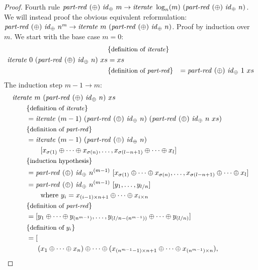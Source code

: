 \begin{proof}
  Fourth rule $\partRed\ (\oplus)\ \id_\oplus\ m \rightarrow \iterateN\ \log_n(m)\ (\partRed\ (\oplus)\ \id_\oplus\ n)$.
  We will instead proof the obvious equivalent reformulation:
  $\partRed\ (\oplus)\ \id_\oplus\ n^m \rightarrow \iterateN\ m\ (\partRed\ (\oplus)\ \id_\oplus\ n)$.
  Proof by induction over $m$.
  We start with the base case $m= 0$:
  \begin{align*}
      &\{\text{\small definition of \text{\textit{iterate}}}\}\\
    \text{\textit{iterate}}\ 0\ (\text{\textit{part-red}}\ (\oplus)\ \text{\textit{id}}_\oplus\ n)\ xs &= xs\\
      & \{\text{\small definition of \text{\textit{part-red}}}\}
      &= \text{\textit{part-red}}\ (\oplus)\ \text{\textit{id}}_\oplus\ 1\ xs
  \end{align*}
  The induction step $m-1 \rightarrow m$:
  \begin{align*}
    &\iterateN\ m\ (\partRed\ (\oplus)\ \id_\oplus\ n)\ xs\\
    &\qquad \comment{definition of \iterateN}\\
    &\qquad = \iterateN\ (m-1)\ (\partRed\ (\oplus)\ \id_\oplus\ n)\ (\partRed\ (\oplus)\ \id_\oplus\ n\ xs)\\
    &\qquad \comment{definition of \partRed}\\
    &\qquad = \iterateN\ (m-1)\ (\partRed\ (\oplus)\ \id_\oplus\ n)\\
    &\qquad\qquad [x_{\sigma(1)} \oplus \dots \oplus x_{\sigma(n)}, \ldots, x_{\sigma(l-n+1)} \oplus \dots \oplus x_{l}]\\
    &\qquad \comment{induction hypothesis}\\
    &\qquad = \partRed\ (\oplus)\ \id_\oplus\ n^{(m-1)}\ [x_{\sigma(1)} \oplus \dots \oplus x_{\sigma(n)}, \ldots, x_{\sigma(l-n+1)} \oplus \dots \oplus x_{l}]\\
    &\qquad = \partRed\ (\oplus)\ \id_\oplus\ n^{(m-1)}\ [y_1, \ldots, y_{l/n}]\\
    &\qquad\qquad \text{where}\ y_i = x_{(i-1)\times n + 1} \oplus \dots \oplus x_{i\times n}\\
    &\qquad \comment{definition of \partRed}\\
    &\qquad = [y_1 \oplus \dots \oplus y_{(n^{m-1})}, \ldots, y_{(l/n - (n^{m-1}))} \oplus \dots \oplus y_{(l/n)}]\\
    &\qquad \comment{definition of $y_i$}\\
    &\qquad = \begin{aligned}[t]
       [&\\
        &(x_1 \oplus \dots \oplus x_n) \oplus \dots \oplus (x_{(n^{m-1}-1)\times n +1} \oplus \dots \oplus x_{(n^{m-1})\times n}),\\

\end{aligned}
\end{align*}
\end{proof}
